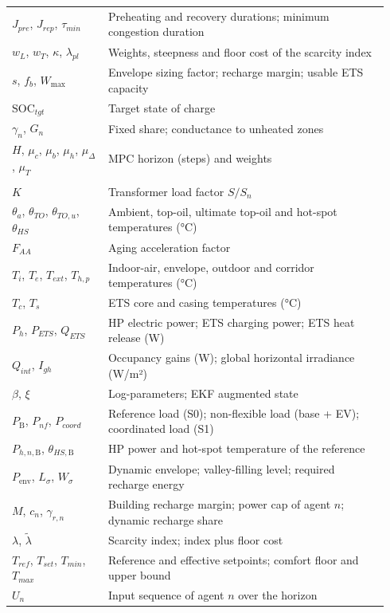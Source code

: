 \documentclass[10pt,letterpaper]{article}
\newcommand{\Penv}{P_{\mathrm{env}}}
\newcommand{\PB}{P_{\mathrm{B}}}
\begin{document}
{\begin{longtable}{@{}>{\raggedright\arraybackslash}p{0.24\linewidth}>{\raggedright\arraybackslash}p{0.70\linewidth}@{}}
$J_{pre}$, $J_{rep}$, $\tau_{min}$ & Preheating and recovery durations; minimum congestion duration \\
$w_L$, $w_T$, $\kappa$, $\lambda_{pl}$ & Weights, steepness and floor cost of the scarcity index \\
$s$, $f_b$, $W_{\max}$ & Envelope sizing factor; recharge margin; usable ETS capacity \\
$\mathrm{SOC}_{tgt}$ & Target state of charge \\
$\gamma_n$, $G_n$ & Fixed share; conductance to unheated zones \\
$H$, $\mu_c$, $\mu_b$, $\mu_h$, $\mu_\Delta$, $\mu_T$ & MPC horizon (steps) and weights \\[4pt]
\multicolumn{2}{@{}l}{\textbf{Variables}}\\
$K$ & Transformer load factor $S/S_n$ \\
$\theta_a$, $\theta_{TO}$, $\theta_{TO,u}$, $\theta_{HS}$ & Ambient, top-oil, ultimate top-oil and hot-spot temperatures (°C) \\
$F_{AA}$ & Aging acceleration factor \\
$T_i$, $T_e$, $T_{ext}$, $T_{h,p}$ & Indoor-air, envelope, outdoor and corridor temperatures (°C) \\
$T_c$, $T_s$ & ETS core and casing temperatures (°C) \\
$P_h$, $P_{ETS}$, $Q_{ETS}$ & HP electric power; ETS charging power; ETS heat release (W) \\
$Q_{int}$, $I_{gh}$ & Occupancy gains (W); global horizontal irradiance (W/m²) \\
$\beta$, $\xi$ & Log-parameters; EKF augmented state \\
$\PB$, $P_{nf}$, $P_{coord}$ & Reference load (S0); non-flexible load (base + EV); coordinated load (S1) \\
$P_{h,n,\mathrm B}$, $\theta_{HS,\mathrm B}$ & HP power and hot-spot temperature of the reference \\
$\Penv$, $L_\sigma$, $W_\sigma$ & Dynamic envelope; valley-filling level; required recharge energy \\
$M$, $c_n$, $\gamma_{r,n}$ & Building recharge margin; power cap of agent $n$; dynamic recharge share \\
$\lambda$, $\tilde\lambda$ & Scarcity index; index plus floor cost \\
$T_{ref}$, $T_{set}$, $T_{min}$, $T_{max}$ & Reference and effective setpoints; comfort floor and upper bound \\
$U_n$ & Input sequence of agent $n$ over the horizon \\
\end{longtable}}
\end{document}
